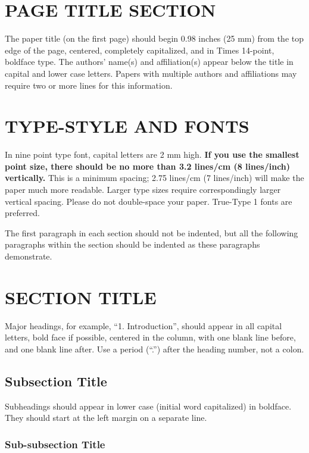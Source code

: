 \documentclass{article}
\begin{document}
\begin{sloppy}
\section{PAGE TITLE SECTION}
\label{sec:pagestyle}

The paper title (on the first page) should begin 0.98 inches 
(25 mm) from the top edge of the page, centered, completely 
capitalized, and in Times 14-point, boldface type.  
The authors' name(s) and affiliation(s) appear below the title
in capital and lower case letters.  Papers with multiple authors 
and affiliations may require two or more lines for this information.

\section{TYPE-STYLE AND FONTS}
\label{sec:typestyle}


In nine point type font, capital letters are 2 mm high.  
{\bf If you use the smallest point size, there should be 
no more than 3.2 lines/cm (8 lines/inch) vertically.}  
This is a minimum spacing; 2.75 lines/cm (7 lines/inch) 
will make the paper much more readable. Larger type sizes 
require correspondingly larger vertical spacing. Please do 
not double-space your paper. True-Type 1 fonts are preferred.

The first paragraph in each section should not be indented, 
but all the following paragraphs within the section should 
be indented as these paragraphs demonstrate.

\section{SECTION TITLE}
\label{sec:majhead}

Major headings, for example, ``1. Introduction'', should 
appear in all capital letters, bold face if possible, 
centered in the column, with one blank line before, 
and one blank line after. Use a period (``.'') after 
the heading number, not a colon.

\subsection{Subsection Title}
\label{ssec:subhead}

Subheadings should appear in lower case (initial word 
capitalized) in boldface. They should start at the left 
margin on a separate line. 
 
\subsubsection{Sub-subsection Title}
\label{sssec:subsubhead}


\end{sloppy}
\end{document}
